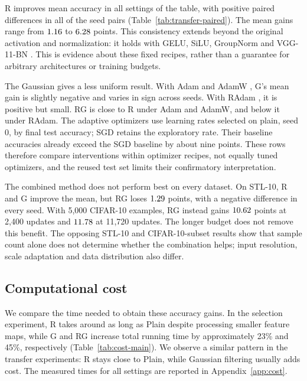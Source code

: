 R improves mean accuracy in all \tSettings{} settings of the table, with positive paired differences in all \tResPositivePairs{} of the \tResPairs{} seed pairs (Table~\ref{tab:transfer-paired}). The mean gains range from $1.16$ to $6.28$ points. This consistency extends beyond the original activation and normalization: it holds with GELU, SiLU, GroupNorm and VGG-11-BN \citep{hendrycks2016gelu,ramachandran2017searching,wu2018group,simonyan2015very}. This is evidence about these fixed recipes, rather than a guarantee for arbitrary architectures or training budgets.

The Gaussian gives a less uniform result. With Adam and AdamW \citep{kingma2015adam,loshchilov2019decoupled}, G's mean gain is slightly negative and varies in sign across seeds. With RAdam \citep{liu2020radam}, it is positive but small. RG is close to R under Adam and AdamW, and below it under RAdam. The adaptive optimizers use learning rates selected on plain, seed 0, by final test accuracy; SGD retains the exploratory rate. Their baseline accuracies already exceed the SGD baseline by about nine points. These rows therefore compare interventions within optimizer recipes, not equally tuned optimizers, and the reused test set limits their confirmatory interpretation.

The combined method does not perform best on every dataset. On STL-10, R and G improve the mean, but RG loses $1.29$ points, with a negative difference in every seed. With 5,000 CIFAR-10 examples, RG instead gains $10.62$ points at 2,400 updates and $11.78$ at 11,720 updates. The longer budget does not remove this benefit. The opposing STL-10 and CIFAR-10-subset results show that sample count alone does not determine whether the combination helps; input resolution, scale adaptation and data distribution also differ.

\subsection{Computational cost}
We compare the time needed to obtain these accuracy gains. In the selection experiment, R takes around as long as Plain despite processing smaller feature maps, while G and RG increase total running time by approximately 23\% and 45\%, respectively (Table~\ref{tab:cost-main}). We observe a similar pattern in the transfer experiments: R stays close to Plain, while Gaussian filtering usually adds cost. The measured times for all settings are reported in Appendix~\ref{app:cost}.


